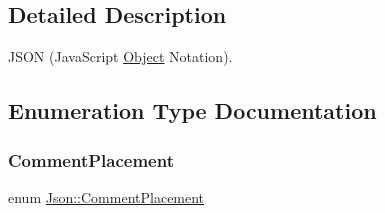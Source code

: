 \subsection{Detailed Description}
J\+S\+ON (Java\+Script \mbox{\hyperlink{class_object}{Object}} Notation). 

\subsection{Enumeration Type Documentation}
\mbox{\label{namespace_json_a4fc417c23905b2ae9e2c47d197a45351}} 
\subsubsection{\texorpdfstring{CommentPlacement}{CommentPlacement}}
{\footnotesize\ttfamily enum \mbox{\hyperlink{namespace_json_a4fc417c23905b2ae9e2c47d197a45351}{Json\+::\+Comment\+Placement}}}

